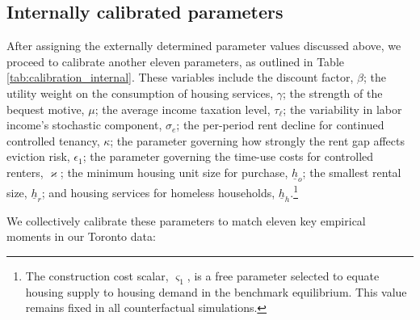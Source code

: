 \documentclass[parskip=full]{article}
\begin{document}
\subsection{Internally calibrated parameters}\label{sec:internal_calibration}

After assigning the externally determined parameter values discussed above, we proceed to calibrate another eleven parameters, as outlined in Table \ref{tab:calibration_internal}. These variables include the discount factor, $\beta$; the utility weight on the consumption of housing services, $\gamma$; the strength of the bequest motive, $\mu$; the average income taxation level, $\tau_{\ell}$; the variability in labor income's stochastic component, $\sigma_{e}$; the per-period rent decline for continued controlled tenancy, $\kappa$; the parameter governing how strongly the rent gap affects eviction risk, $\epsilon_1$; the parameter governing the time-use costs for controlled renters, $\varkappa$; the minimum housing unit size for purchase, $\underline{h}_{o}$; the smallest rental size, $\underline{h}_{r}$; and housing services for homeless households, $\underline{h}_{h}$.\footnote{The construction cost scalar, $\varsigma_{1}$, is a free parameter selected to equate housing supply to housing demand in the benchmark equilibrium. This value remains fixed in all counterfactual simulations.}

We collectively calibrate these parameters to match eleven key empirical moments in our Toronto data:
\end{document}
